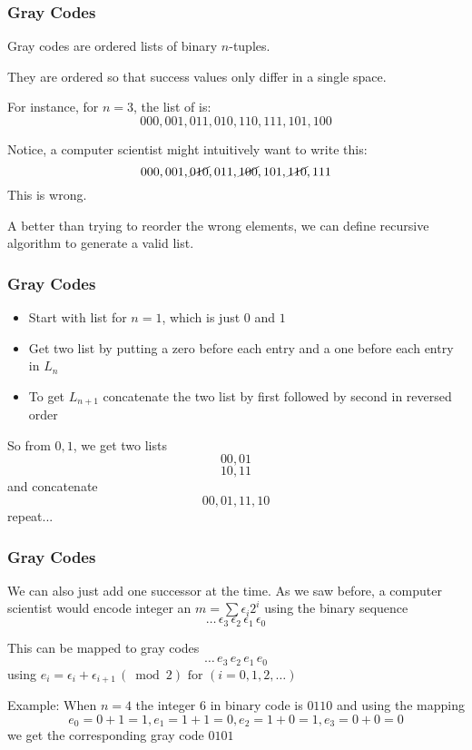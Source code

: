 \documentclass[10pt]{beamer}
\begin{document}
\begin{frame}
\frametitle{Gray Codes}

Gray codes are ordered lists of binary $n$-tuples. \newline

They are ordered so that success values only differ in a single space.

For instance, for $n = 3$, the list of is:
\[ 000, 001, 011, 010, 110, 111, 101, 100 \]

Notice, a computer scientist might intuitively want to write this:
\[ 000, 001, \cancel{010}, 011, \cancel{100}, 101, \cancel{110}, 111 \]
This is wrong. \newline

A better than trying to reorder the wrong elements, we can define recursive algorithm to generate a valid list.

\end{frame}

\begin{frame}
\frametitle{Gray Codes}

\begin{itemize}
\item Start with list for $n = 1$, which is just $0$ and $1$ 
\item Get two list by putting a zero before each entry and a one before each entry in $L_n$ 
\item To get $L_{n+1}$ concatenate the two list by first followed by second in reversed order 
\end{itemize}

\vspace{0.3cm}
So from $0,1$, we get two lists
\[ 00, 01 \]
\[ 10, 11 \]
and concatenate
\[  00, 01, 11, 10 \]
repeat...

\end{frame}

\begin{frame}
\frametitle{Gray Codes}

We can also just add one successor at the time. 
As we saw before, a computer scientist would encode integer an $m = \sum \epsilon_i 2^i$
using the binary sequence 
\[ \dots \, \epsilon_3 \, \epsilon_2 \, \epsilon_1 \, \epsilon_0 \]

This can be mapped to gray codes 
\[ \dots \, e_3 \, e_2 \, e_1 \, e_0 \]
using $e_i = \epsilon_i + \epsilon_{i+1} \, (\bmod 2) \text{ for } (i = 0,1,2,\dots)$ \newline

Example: 
When $n = 4$ the integer $6$ in binary code is $0110$ and using the mapping 
\[ e_0 = 0 + 1 = 1, e_1 = 1 + 1 = 0, e_2 = 1 + 0 = 1, e_3 = 0 + 0 = 0 \]
we get the corresponding gray code $0101$

\end{frame}
\end{document}
